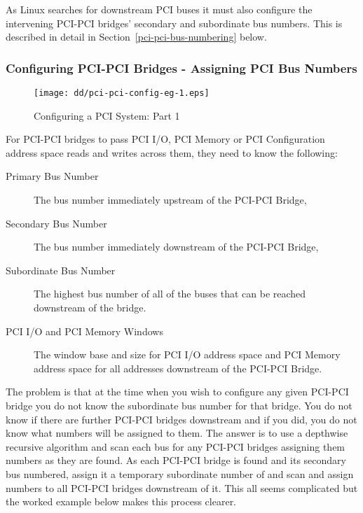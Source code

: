 As Linux searches for downstream PCI buses it must 
also configure the intervening PCI-PCI bridges' secondary 
and subordinate bus numbers.  
This is described in detail in Section~\ref{pci-pci-bus-numbering} below.

\subsubsection{Configuring PCI-PCI Bridges - Assigning PCI Bus Numbers}
\label{pci-pci-bus-numbering}
\begin{figure}
\begin{center}
{\centering \texttt{[image: dd/pci-pci-config-eg-1.eps]} \par}
\end{center}
\caption{Configuring a PCI System: Part 1}
\label{pci-pci-config-eg-1}
\end{figure}
For PCI-PCI bridges to pass PCI I/O, PCI Memory or PCI 
Configuration address space reads and writes across them, 
they need to know the following:
\begin{description}
	\item[Primary Bus Number] The bus number immediately
	upstream of the PCI-PCI Bridge,
	\item [Secondary Bus Number] The bus number immediately
	downstream of the PCI-PCI Bridge,
	\item [Subordinate Bus Number] The highest bus number of all
		of the buses that can be reached downstream of the bridge.	
	\item [PCI I/O and PCI Memory Windows] The window base and size for PCI I/O address space 
     	and PCI Memory address space for all addresses downstream of the PCI-PCI Bridge.
\end{description}

The problem is that at the time when you wish to 
configure any given PCI-PCI bridge you do not know the 
subordinate bus number for that bridge.  You do not know 
if there are further PCI-PCI bridges downstream and if 
you did, you do not know what numbers will be assigned to 
them.
The answer is to use a depthwise recursive algorithm
and scan each bus for any PCI-PCI bridges assigning them 
numbers as they are found.  
As each PCI-PCI bridge is found and its secondary bus numbered, assign it a 
temporary subordinate number of  and scan and assign 
numbers to all PCI-PCI bridges downstream of it.  
This all seems complicated but the worked example below makes this process
clearer.

